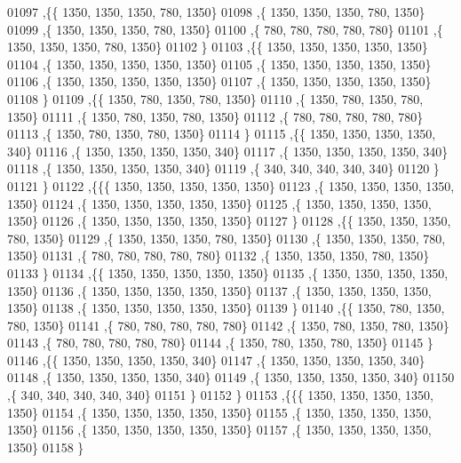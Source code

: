 \begin{DoxyCode}
01097   ,\{\{  1350,  1350,  1350,   780,  1350\}
01098    ,\{  1350,  1350,  1350,   780,  1350\}
01099    ,\{  1350,  1350,  1350,   780,  1350\}
01100    ,\{   780,   780,   780,   780,   780\}
01101    ,\{  1350,  1350,  1350,   780,  1350\}
01102    \}
01103   ,\{\{  1350,  1350,  1350,  1350,  1350\}
01104    ,\{  1350,  1350,  1350,  1350,  1350\}
01105    ,\{  1350,  1350,  1350,  1350,  1350\}
01106    ,\{  1350,  1350,  1350,  1350,  1350\}
01107    ,\{  1350,  1350,  1350,  1350,  1350\}
01108    \}
01109   ,\{\{  1350,   780,  1350,   780,  1350\}
01110    ,\{  1350,   780,  1350,   780,  1350\}
01111    ,\{  1350,   780,  1350,   780,  1350\}
01112    ,\{   780,   780,   780,   780,   780\}
01113    ,\{  1350,   780,  1350,   780,  1350\}
01114    \}
01115   ,\{\{  1350,  1350,  1350,  1350,   340\}
01116    ,\{  1350,  1350,  1350,  1350,   340\}
01117    ,\{  1350,  1350,  1350,  1350,   340\}
01118    ,\{  1350,  1350,  1350,  1350,   340\}
01119    ,\{   340,   340,   340,   340,   340\}
01120    \}
01121   \}
01122  ,\{\{\{  1350,  1350,  1350,  1350,  1350\}
01123    ,\{  1350,  1350,  1350,  1350,  1350\}
01124    ,\{  1350,  1350,  1350,  1350,  1350\}
01125    ,\{  1350,  1350,  1350,  1350,  1350\}
01126    ,\{  1350,  1350,  1350,  1350,  1350\}
01127    \}
01128   ,\{\{  1350,  1350,  1350,   780,  1350\}
01129    ,\{  1350,  1350,  1350,   780,  1350\}
01130    ,\{  1350,  1350,  1350,   780,  1350\}
01131    ,\{   780,   780,   780,   780,   780\}
01132    ,\{  1350,  1350,  1350,   780,  1350\}
01133    \}
01134   ,\{\{  1350,  1350,  1350,  1350,  1350\}
01135    ,\{  1350,  1350,  1350,  1350,  1350\}
01136    ,\{  1350,  1350,  1350,  1350,  1350\}
01137    ,\{  1350,  1350,  1350,  1350,  1350\}
01138    ,\{  1350,  1350,  1350,  1350,  1350\}
01139    \}
01140   ,\{\{  1350,   780,  1350,   780,  1350\}
01141    ,\{   780,   780,   780,   780,   780\}
01142    ,\{  1350,   780,  1350,   780,  1350\}
01143    ,\{   780,   780,   780,   780,   780\}
01144    ,\{  1350,   780,  1350,   780,  1350\}
01145    \}
01146   ,\{\{  1350,  1350,  1350,  1350,   340\}
01147    ,\{  1350,  1350,  1350,  1350,   340\}
01148    ,\{  1350,  1350,  1350,  1350,   340\}
01149    ,\{  1350,  1350,  1350,  1350,   340\}
01150    ,\{   340,   340,   340,   340,   340\}
01151    \}
01152   \}
01153  ,\{\{\{  1350,  1350,  1350,  1350,  1350\}
01154    ,\{  1350,  1350,  1350,  1350,  1350\}
01155    ,\{  1350,  1350,  1350,  1350,  1350\}
01156    ,\{  1350,  1350,  1350,  1350,  1350\}
01157    ,\{  1350,  1350,  1350,  1350,  1350\}
01158    \}

\end{DoxyCode}
